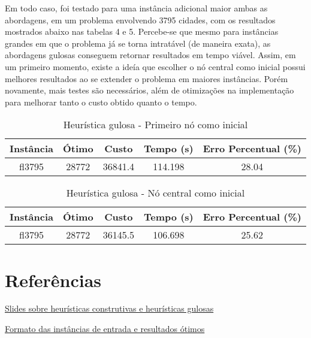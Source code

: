 \documentclass[10pt]{extarticle} %
\begin{document}
Em todo caso, foi testado para uma instância adicional maior ambas as abordagens, em um problema envolvendo 3795 cidades, com os resultados mostrados abaixo nas tabelas 4 e 5. Percebe-se que mesmo para instâncias grandes em que o problema já se torna intratável (de maneira exata), as abordagens gulosas conseguem retornar resultados em tempo viável. Assim, em um primeiro momento, existe a ideía que escolher o nó central como inicial possui melhores resultados ao se extender o problema em maiores instâncias. Porém novamente, mais testes são necessários, além de otimizações na implementação para melhorar tanto o custo obtido quanto o tempo.

\begin{table}[H]
    \centering
    \begin{tabular}{|c|c|c|c|c|} \hline 
         \textbf{Instância} & \textbf{Ótimo} & \textbf{Custo} & \textbf{Tempo (s)} & \textbf{Erro Percentual (\%)} \\ \hline 
         fl3795       & 28772     & 36841.4    & 114.198  & 28.04 \\ \hline
    \end{tabular}
    \caption{Heurística gulosa - Primeiro nó como inicial}
    \label{tab:my_label}
\end{table}

\begin{table}[H]
    \centering
    \begin{tabular}{|c|c|c|c|c|} \hline 
         \textbf{Instância} & \textbf{Ótimo} & \textbf{Custo} & \textbf{Tempo (s)} & \textbf{Erro Percentual (\%)} \\ \hline 
         fl3795       & 28772     & 36145.5    & 106.698  & 25.62 \\ \hline
    \end{tabular}
    \caption{Heurística gulosa - Nó central como inicial}
    \label{tab:my_label}
\end{table}

\section{Referências}

\noindent \href{http://www.decom.ufop.br/prof/marcone/Disciplinas/InteligenciaComputacional/HeuristicasConstrutivas.pdf}{Slides sobre heurísticas construtivas e heurísticas gulosas}

\noindent \href{http://comopt.ifi.uni-heidelberg.de/software/TSPLIB95/}{Formato das instâncias de entrada e resultados ótimos}
\end{document}
